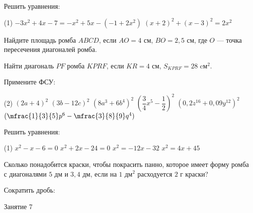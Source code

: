 \begin{class}[number=6]
	\begin{listofex}
		\item Решить уравнения:
		\begin{tasks}(1)
		\task \( -3x^2+4x-7=-x^2+5x-(-1+2x^2) \)
		\task \( (x+2)^2+(x-3)^2=2x^2 \)
		\end{tasks}
		\item Найдите  площадь ромба  \( ABCD \), если \( AO = 4  \) см, \( BO = 2,5 \) см, где  \( O \) --- точка пересечения диагоналей ромба.
		\item Найти диагональ \( PF \) ромба \( KPRF \), если \( KR =4 \) см, \( S_{KPRF}=28 \) cм\( ^2 \).
		\item \exercise{1508}
		\item Примените ФСУ:
		\begin{tasks}(2)
			\task \( (2a+4)^2 \)
			\task \( (3b-12c)^2 \)
			\task \( (8a^3+6b^4)^2 \)
			\task \( (\dfrac{3}{4}x^5-\dfrac{1}{2})^2 \)
			\task \( (0,2z^{16}+0,09y^{12})^2 \)
			\task \( (\mfrac{1}{3}{5}p^6-\mfrac{3}{8}{9}q^4) \)
		\end{tasks}
	\end{listofex}
\end{class}


\begin{homework}[number=3]
	\begin{listofex}
		\item Решить уравнения:
		\begin{tasks}(1)
			\task \( x^2-x-6=0 \)
			\task \( x^2+2x-24=0 \)
			\task \( x^2=-12x-32 \)
			\task \( x^2=4x+45 \)
		\end{tasks}
		\item Сколько понадобится краски, чтобы покрасить панно, которое имеет форму ромба с диагоналями \( 5 \) дм и \( 3,4 \) дм, если на \( 1 \) дм\( ^2 \) расходуется \( 2 \) г краски?
		\item Сократить дробь:
		\begin{itasks}[2]
			\task \exercise{73}
			\task \exercise{76}
		\end{itasks}
	\end{listofex}
\end{homework}

\begin{class}[number=7]
	\begin{listofex}
		\item Занятие 7
	\end{listofex}
\end{class}

